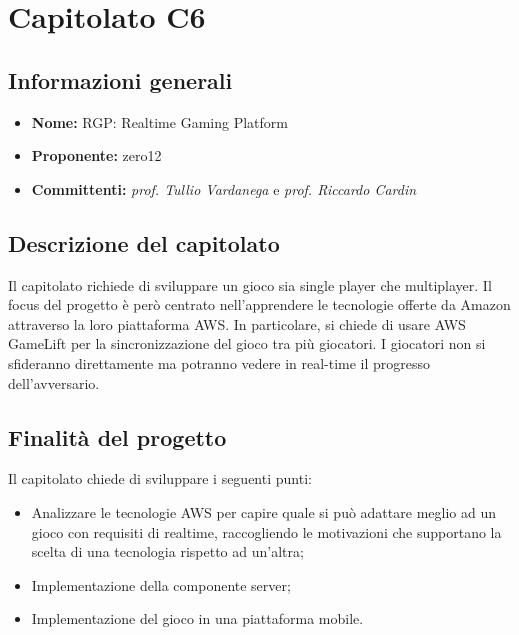 \section{Capitolato C6}

\subsection{Informazioni generali}
\begin{itemize}
\item \textbf{Nome:} RGP: Realtime Gaming Platform
\item \textbf{Proponente:} zero12
\item \textbf{Committenti:} \textit{prof. Tullio Vardanega} e \textit{prof. Riccardo Cardin}
\end{itemize}

\subsection{Descrizione del capitolato}
Il capitolato richiede di sviluppare un gioco sia single player che multiplayer.
Il focus del progetto è però centrato nell'apprendere le tecnologie offerte da Amazon attraverso la loro piattaforma AWS.
In particolare, si chiede di usare AWS GameLift per la sincronizzazione del gioco tra più giocatori.
I giocatori non si sfideranno direttamente ma potranno vedere in real-time il progresso dell'avversario.

\subsection{Finalità del progetto}
Il capitolato chiede di sviluppare i seguenti punti:
\begin{itemize}
\item Analizzare le tecnologie AWS per capire quale si può adattare meglio ad un gioco con requisiti di realtime, raccogliendo le motivazioni che supportano la scelta di una tecnologia rispetto ad un'altra;
\item Implementazione della componente server;
\item Implementazione del gioco in una piattaforma mobile.
\end{itemize}

